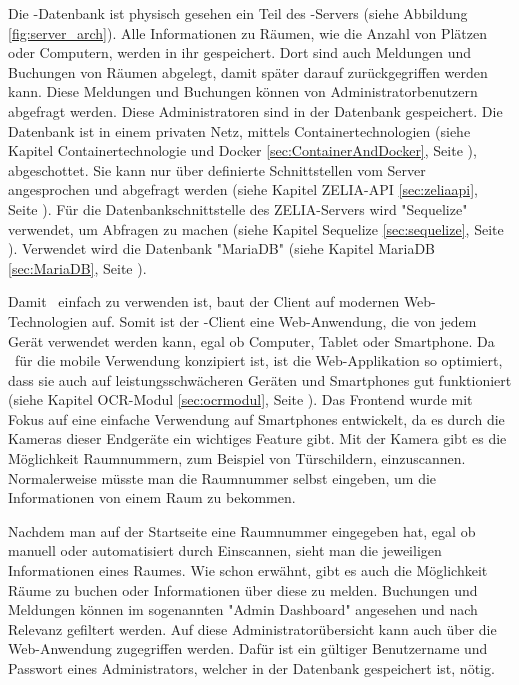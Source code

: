 Die \ZELIA-Datenbank ist physisch gesehen ein Teil des \ZELIA-Servers (siehe Abbildung \ref{fig:server_arch}). Alle Informationen zu Räumen, wie die Anzahl von Plätzen oder Computern, werden in ihr gespeichert. Dort sind auch Meldungen und Buchungen von Räumen abgelegt, damit später darauf zurückgegriffen werden kann. Diese Meldungen und Buchungen können von Administratorbenutzern abgefragt werden. Diese Administratoren sind in der Datenbank gespeichert. Die Datenbank ist in einem privaten Netz, mittels Containertechnologien (siehe Kapitel Containertechnologie und Docker \ref{sec:ContainerAndDocker}, Seite \pageref{sec:ContainerAndDocker}), abgeschottet. Sie kann nur über definierte Schnittstellen vom Server angesprochen und abgefragt werden (siehe Kapitel ZELIA-API \ref{sec:zeliaapi}, Seite \pageref{sec:zeliaapi}). Für die Datenbankschnittstelle des ZELIA-Servers wird "Sequelize" verwendet, um Abfragen zu machen (siehe Kapitel Sequelize \ref{sec:sequelize}, Seite \pageref{sec:sequelize}). Verwendet wird die Datenbank "MariaDB" (siehe Kapitel MariaDB \ref{sec:MariaDB}, Seite \pageref{sec:sequelize}).



Damit \ZELIA\ einfach zu verwenden ist, baut der Client auf modernen Web-\-Techno\-logien auf. Somit ist der \ZELIA-Client eine Web-Anwendung,  die von jedem Gerät verwendet werden kann, egal ob Computer, Tablet oder Smartphone. Da \ZELIA\ für die mobile Verwendung konzipiert ist, ist die Web-Applikation so optimiert, dass sie auch auf leistungsschwächeren Geräten und Smartphones gut funktioniert (siehe Kapitel OCR-Modul \ref{sec:ocrmodul}, Seite \pageref{sec:ocrmodul}). Das Frontend wurde mit Fokus auf eine einfache Verwendung auf Smartphones entwickelt, da es durch die Kameras dieser Endgeräte ein wichtiges Feature gibt. Mit der Kamera gibt es die Möglichkeit Raumnummern, zum Beispiel von Türschildern, einzuscannen. Normalerweise müsste man die Raumnummer selbst eingeben, um die Informationen von einem Raum zu bekommen. 

Nachdem man auf der Startseite eine Raumnummer eingegeben hat, egal ob manuell oder automatisiert durch Einscannen, sieht man die jeweiligen Informationen eines Raumes. Wie schon erwähnt, gibt es auch die Möglichkeit Räume zu buchen oder Informationen über diese zu melden. Buchungen und Meldungen können im sogenannten "Admin Dashboard" angesehen und nach Relevanz gefiltert werden. Auf diese Administratorübersicht kann auch über die Web-Anwendung zugegriffen werden. Dafür ist ein gültiger Benutzername und Passwort eines Administrators, welcher in der Datenbank gespeichert ist, nötig.

